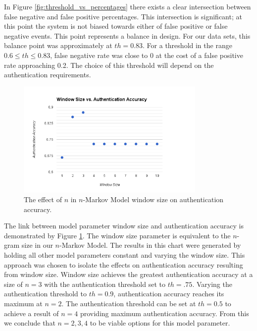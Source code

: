 \documentclass{acm_proc_article-sp}
\begin{document}
In Figure \ref{fig:threshold_vs_percentages} there exists a clear intersection between false negative and false positive percentages. This intersection is significant; at this point the system is not biased towards
either of false positive or false negative events. This point represents a balance in design. For our
data sets, this balance point was approximately at $th=0.83$. For a threshold in the range
$0.6 \leq th \leq 0.83$, false negative rate was close to 0 at the cost of a false positive rate approaching 0.2.
The choice of this threshold will depend on the authentication requirements.

\begin{figure}
\centering
\includegraphics[width=3.6in]{window_size_vs_authentication_accuracy.png}
\caption{The effect of $n$ in $n$-Markov Model window size on authentication accuracy.}
\label{fig:window_size_vs_authentication_accuracy}
\end{figure}

The link between model parameter window size and authentication accuracy is demonstrated by Figure \ref{fig:window_size_vs_authentication_accuracy}.
The window size parameter is equivalent to the $n$-gram size in our $n$-Markov Model.
The results in this chart were generated by holding all other model parameters constant and varying the window size. This approach was chosen to isolate the effects on authentication accuracy resulting from window size.
Window size achieves the greatest authentication accuracy at a size of $n=3$ with the authentication threshold set to $th=.75$.
Varying the authentication threshold to $th=0.9$, authentication accuracy reaches its maximum at $n=2$. 
The authentication threshold can be set at $th=0.5$ to achieve a result of $n=4$ providing maximum authentication accuracy.
From this we conclude that $n={2,3,4}$ to be viable options for this model parameter.
\end{document}
